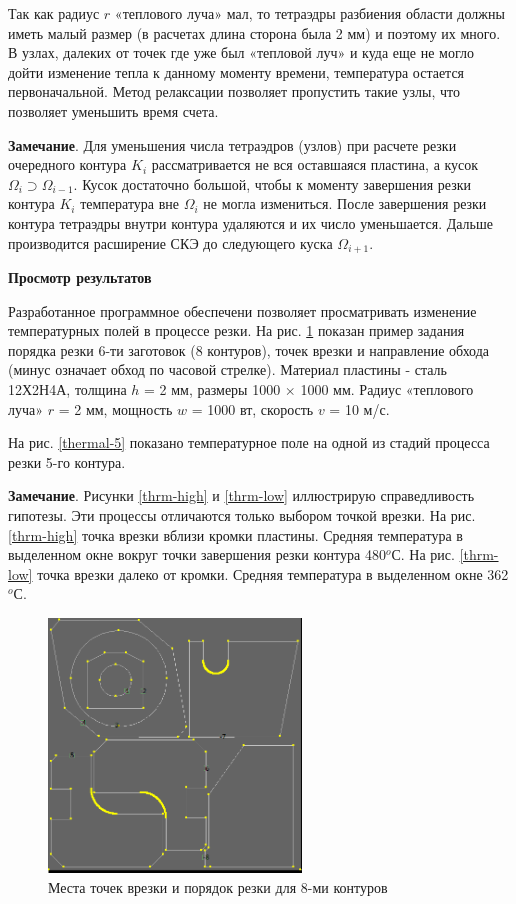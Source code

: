 \documentclass[12pt,twoside]{report}
\begin{document}
Так как радиус  $r$
«теплового луча» мал,
то тетраэдры разбиения области должны иметь малый размер
(в расчетах длина сторона была  2 мм)
и поэтому их много.
В узлах, далеких от точек где уже был «тепловой луч»
и куда еще не могло дойти изменение тепла к данному моменту времени,
температура остается первоначальной.
Метод релаксации позволяет пропустить такие узлы,
что позволяет уменьшить время счета.

{\bf Замечание}.
Для уменьшения числа тетраэдров (узлов)
при расчете резки очередного контура
$K_i$
рассматривается не вся оставшаяся пластина, а кусок
$\Omega_i \supset \Omega_{i-1}$.
Кусок  достаточно большой,
чтобы к моменту завершения резки контура
$K_i$
температура вне
$\Omega_i$
не могла измениться.
После завершения резки контура
тетраэдры внутри контура удаляются и их число уменьшается.
Дальше производится расширение СКЭ до следующего куска
$\Omega_{i+1}$.

{\bf Просмотр результатов}

Разработанное программное обеспечени
позволяет просматривать изменение температурных полей
в процессе резки.
На рис. \ref{thermal-plan}
показан пример задания порядка резки
6-ти заготовок (8 контуров),
точек врезки и направление обхода
(минус означает обход по часовой стрелке).
Материал пластины -  сталь 12Х2Н4А,
толщина $h$ = 2 мм, размеры 1000 $\times$ 1000 мм.
Радиус «теплового луча» $r$ = 2 мм,
мощность $w$ = 1000 вт,
скорость $v$ = 10 м/с.

На рис. \ref{thermal-5} показано температурное поле
на одной из стадий процесса резки 5-го контура.

{\bf Замечание}.
Рисунки \ref{thrm-high} и \ref{thrm-low}  иллюстрирую справедливость гипотезы.
Эти процессы отличаются только выбором точкой врезки.
На рис. \ref{thrm-high} точка врезки вблизи кромки пластины.
Средняя температура в выделенном окне
вокруг точки завершения резки контура 480$^o$С.
На рис. \ref{thrm-low} точка врезки далеко от кромки.
Средняя температура в выделенном окне  362$^o$С.

\begin{figure}
  \centering
  \includegraphics[width=0.6\textwidth]{thermal-plan.png}
  \caption{Места точек врезки и порядок резки для 8-ми контуров}
  \label{thermal-plan}
\end{figure}
\end{document}

